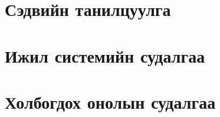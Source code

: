 
\chapter{Сэдвийн танилцуулга}


\chapter{Ижил системийн судалгаа}


\chapter{Холбогдох онолын судалгаа}
